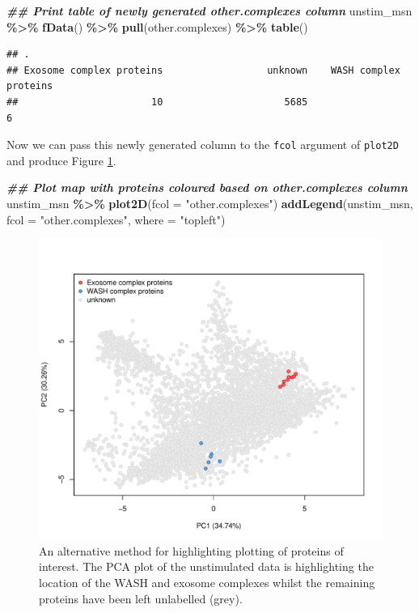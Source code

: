 \documentclass[9pt,a4paper,]{extarticle}
\newenvironment{Shaded}{\begin{snugshade}}{\end{snugshade}}
\newcommand{\AttributeTok}[1]{\textcolor[rgb]{0.13,0.29,0.53}{#1}}
\newcommand{\DocumentationTok}[1]{\textcolor[rgb]{0.56,0.35,0.01}{\textbf{\textit{#1}}}}
\newcommand{\FunctionTok}[1]{\textcolor[rgb]{0.13,0.29,0.53}{\textbf{#1}}}
\newcommand{\NormalTok}[1]{#1}
\newcommand{\SpecialCharTok}[1]{\textcolor[rgb]{0.81,0.36,0.00}{\textbf{#1}}}
\newcommand{\StringTok}[1]{\textcolor[rgb]{0.31,0.60,0.02}{#1}}
\begin{document}
\begin{Shaded}
\begin{Highlighting}[]
\DocumentationTok{\#\# Print table of newly generated other.complexes column}
\NormalTok{unstim\_msn }\SpecialCharTok{\%\textgreater{}\%} 
  \FunctionTok{fData}\NormalTok{() }\SpecialCharTok{\%\textgreater{}\%} 
  \FunctionTok{pull}\NormalTok{(other.complexes) }\SpecialCharTok{\%\textgreater{}\%} 
  \FunctionTok{table}\NormalTok{()}
\end{Highlighting}
\end{Shaded}

\begin{verbatim}
## .
## Exosome complex proteins                  unknown    WASH complex proteins 
##                       10                     5685                        6
\end{verbatim}

Now we can pass this newly generated column to the \texttt{fcol} argument of \texttt{plot2D}
and produce Figure \ref{fig:fig-pca-complexes}.

\begin{Shaded}
\begin{Highlighting}[]
\DocumentationTok{\#\# Plot map with proteins coloured based on other.complexes column}
\NormalTok{unstim\_msn }\SpecialCharTok{\%\textgreater{}\%} 
  \FunctionTok{plot2D}\NormalTok{(}\AttributeTok{fcol =} \StringTok{"other.complexes"}\NormalTok{)}
\FunctionTok{addLegend}\NormalTok{(unstim\_msn, }\AttributeTok{fcol =} \StringTok{"other.complexes"}\NormalTok{, }\AttributeTok{where =} \StringTok{"topleft"}\NormalTok{)}
\end{Highlighting}
\end{Shaded}

\begin{figure}[H]

{\centering \includegraphics[width=0.7\linewidth,]{figs/annotated_pca2} 

}

\caption{An alternative method for highlighting plotting of proteins of interest. The PCA plot of the unstimulated data is highlighting the location of the WASH and exosome complexes whilst the remaining proteins have been left unlabelled (grey).}\label{fig:fig-pca-complexes}
\end{figure}
\end{document}
